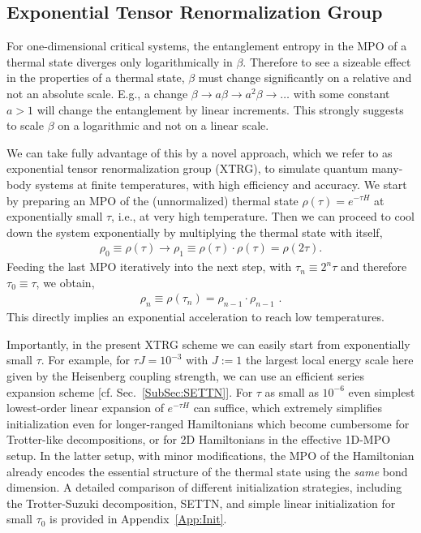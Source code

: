 \documentclass[aps,prx,twocolumn,showpacs,psfig,superscriptaddress,longbibliography]{revtex4-1}
\newcommand{\Sec}[1]{Sec.~\ref{#1}}
\newcommand{\App}[1]{Appendix~\ref{#1}}
\def\taui{\tau_0}
\begin{document}
\subsection{Exponential Tensor Renormalization Group}
\label{SubSec:XTRG}

For one-dimensional critical systems, the entanglement entropy in
the MPO of a thermal state diverges only logarithmically in $\beta$.
Therefore to see a sizeable effect in the properties of a thermal
state, $\beta$ must change significantly on a relative and not an
absolute scale. E.g., a change $\beta \to a\beta  \to a^2\beta \to
\ldots$ with some constant $a>1$ will change the entanglement by
linear increments. This strongly suggests to scale $\beta$ on a
logarithmic and not on a linear scale.

We can take fully advantage of this by a novel approach, which we
refer to as exponential tensor renormalization group (XTRG), to
simulate quantum many-body systems at finite temperatures, with high
efficiency and accuracy. We start by preparing an MPO of the
(unnormalized) thermal state $\rho(\tau)=e^{-\tau H}$ at
exponentially small $\tau$, i.e., at very high temperature. Then we
can proceed to cool down the system exponentially by multiplying the
thermal state with itself, 
%
\begin{eqnarray}
  \rho_0 \equiv \rho(\tau)
  \to \rho_1 \equiv \rho(\tau) \cdot \rho(\tau) = \rho(2\tau)
  \text{.}
\label{eq:rhoinit}
\end{eqnarray}
%
Feeding the last MPO iteratively into the next step, with $\tau_{n}
\equiv 2^n\tau$ and therefore $\taui \equiv \tau$, we obtain,
%
\begin{eqnarray}
   \rho_n \equiv \rho(\tau_n) = \rho_{n-1} \cdot \rho_{n-1}
\text{ .}\label{eq:rho:scale2}
\end{eqnarray}
This directly implies an exponential acceleration to reach low
temperatures.

Importantly, in the present XTRG scheme we can easily start from
exponentially small $\tau$.  For example, for $\tau J = 10^{-3}$
with $J:=1$ the largest local energy scale here given by the
Heisenberg coupling strength, we can use an efficient series
expansion scheme [cf.  \Sec{SubSec:SETTN}].  For $\tau$ as small as
$10^{-6}$ even simplest lowest-order linear expansion of $e^{-\tau
H}$ can suffice, which extremely simplifies initialization even for
longer-ranged Hamiltonians  {which become cumbersome for 
Trotter-like decompositions}, 
or for 2D Hamiltonians in the effective 1D-MPO
setup.  In the latter setup, with minor modifications, the MPO of
the Hamiltonian already encodes the essential structure of the
thermal state using the {\it same} bond dimension. A detailed
comparison of different initialization strategies, including the
Trotter-Suzuki decomposition, SETTN, and simple linear
initialization for small $\taui$ is provided in \App{App:Init}.
\end{document}
